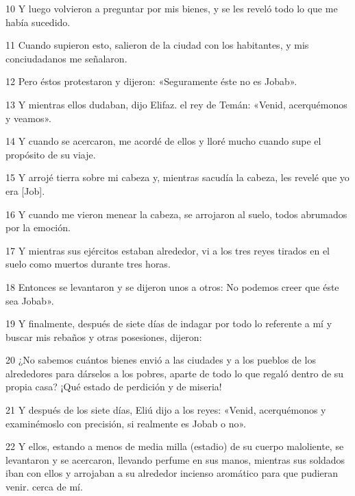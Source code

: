 \par 10 Y luego volvieron a preguntar por mis bienes, y se les reveló todo lo que me había sucedido.

\par 11 Cuando supieron esto, salieron de la ciudad con los habitantes, y mis conciudadanos me señalaron.

\par 12 Pero éstos protestaron y dijeron: «Seguramente éste no es Jobab».

\par 13 Y mientras ellos dudaban, dijo Elifaz. el rey de Temán: «Venid, acerquémonos y veamos».

\par 14 Y cuando se acercaron, me acordé de ellos y lloré mucho cuando supe el propósito de su viaje.

\par 15 Y arrojé tierra sobre mi cabeza y, mientras sacudía la cabeza, les revelé que yo era [Job].

\par 16 Y cuando me vieron menear la cabeza, se arrojaron al suelo, todos abrumados por la emoción.

\par 17 Y mientras sus ejércitos estaban alrededor, vi a los tres reyes tirados en el suelo como muertos durante tres horas.

\par 18 Entonces se levantaron y se dijeron unos a otros: No podemos creer que éste sea Jobab».

\par 19 Y finalmente, después de siete días de indagar por todo lo referente a mí y buscar mis rebaños y otras posesiones, dijeron:

\par 20 ¿No sabemos cuántos bienes envió a las ciudades y a los pueblos de los alrededores para dárselos a los pobres, aparte de todo lo que regaló dentro de su propia casa? ¡Qué estado de perdición y de miseria!

\par 21 Y después de los siete días, Eliú dijo a los reyes: «Venid, acerquémonos y examinémoslo con precisión, si realmente es Jobab o no».

\par 22 Y ellos, estando a menos de media milla (estadio) de su cuerpo maloliente, se levantaron y se acercaron, llevando perfume en sus manos, mientras sus soldados iban con ellos y arrojaban a su alrededor incienso aromático para que pudieran venir. cerca de mí.


